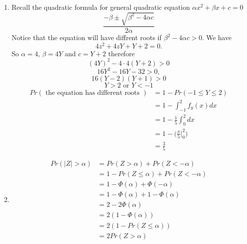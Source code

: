\documentclass[a4paper, 11pt, oneside]{article}
\newcommand\abs[1]{\left|#1\right|}
\begin{document}
\begin{enumerate}
\begin{enumerate}
\item  
Recall the quadratic formula for general quadratic equation $\alpha x^2 + \beta x + c = 0$
\begin{equation*}
\frac{-\beta \pm \sqrt{\beta^2 - 4\alpha c}}{2\alpha}
\end{equation*}
Notice that the equation will have diffrent roots if $\beta^2 - 4\alpha c > 0$. We have 
\begin{equation*}
4z^2 + 4zY + Y + 2 = 0.
\end{equation*}
 So $\alpha = 4$, $\beta = 4Y$ and $c = Y + 2$ therefore
 \begin{equation*}
 (4Y)^2 - 4 \cdot 4(Y + 2) > 0
\end{equation*}
 \begin{equation*}
 16Y^2 - 16 Y - 32 > 0,
\end{equation*}
 \begin{equation*}
 16(Y - 2)(Y + 1) > 0
\end{equation*}
 \begin{equation*}
Y > 2 \text{ or } Y < -1
\end{equation*}
 \begin{align*}
 Pr(\text{ the equation has different roots }) &=
1 - Pr(-1\leq Y\leq 2) \\&=
1 - \int^2_{-1}f_y(x)dx \\&=
 1 - \frac{1}{5} \int^2_{0}dx \\&=
1 - \Big(\frac{x}{5}\Bigr|^2_0\Big) \\&= \frac{3}{5}
 \end{align*}
\item  
 \begin{align*}
Pr(\abs{Z}>\alpha) &=
Pr(Z>\alpha) + Pr(Z<-\alpha) \\&=
1 - Pr(Z \leq \alpha) + Pr(Z<-\alpha) \\&=
1 - \Phi(\alpha) + \Phi(-\alpha) \\&=
1 - \Phi(\alpha) + 1 - \Phi(\alpha) \\&=
2 - 2\Phi(\alpha)  \\&=
2(1 -\Phi(\alpha))\\&=
2(1 - Pr(Z\leq\alpha)) \\&=
 2Pr(Z>\alpha)
 \end{align*}
 \end{enumerate} 
\end{enumerate}
\end{document}
